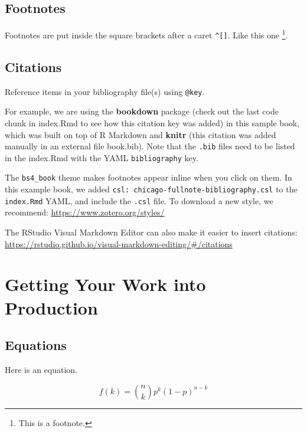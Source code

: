 \documentclass[
  12pt,
]{book}
\theoremstyle{definition}
\theoremstyle{definition}
\theoremstyle{definition}
\theoremstyle{definition}
\theoremstyle{remark}
\begin{document}
\hypertarget{footnotes}{%
\section{Footnotes}\label{footnotes}}

Footnotes are put inside the square brackets after a caret \texttt{\^{}{[}{]}}. Like this one \footnote{This is a footnote.}.

\hypertarget{citations}{%
\section{Citations}\label{citations}}

Reference items in your bibliography file(s) using \texttt{@key}.

For example, we are using the \textbf{bookdown} package \citep{R-bookdown} (check out the last code chunk in index.Rmd to see how this citation key was added) in this sample book, which was built on top of R Markdown and \textbf{knitr} \citep{xie2015} (this citation was added manually in an external file book.bib).
Note that the \texttt{.bib} files need to be listed in the index.Rmd with the YAML \texttt{bibliography} key.

The \texttt{bs4\_book} theme makes footnotes appear inline when you click on them. In this example book, we added \texttt{csl:\ chicago-fullnote-bibliography.csl} to the \texttt{index.Rmd} YAML, and include the \texttt{.csl} file. To download a new style, we recommend: \url{https://www.zotero.org/styles/}

The RStudio Visual Markdown Editor can also make it easier to insert citations: \url{https://rstudio.github.io/visual-markdown-editing/\#/citations}

\hypertarget{production}{%
\chapter{Getting Your Work into Production}\label{production}}

\hypertarget{equations}{%
\section{Equations}\label{equations}}

Here is an equation.

\begin{equation} 
  f\left(k\right) = \binom{n}{k} p^k\left(1-p\right)^{n-k}
  \label{eq:binom}
\end{equation}
\end{document}
